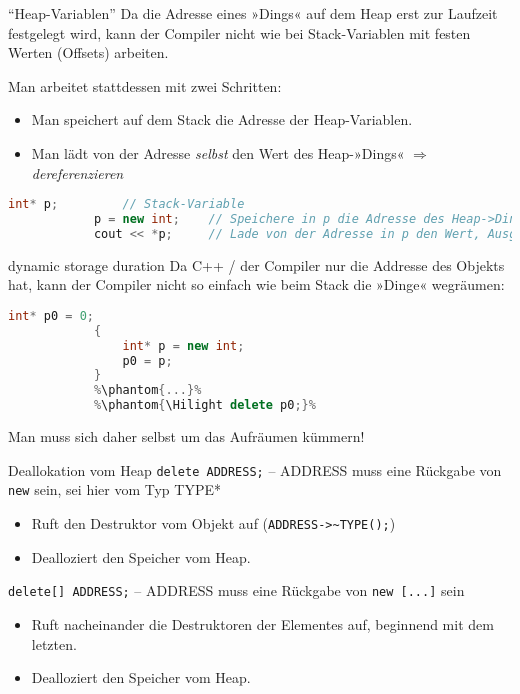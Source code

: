 \begin{frame}[fragile]{\enquote{Heap-Variablen}}
	Da die Adresse eines »Dings« auf dem Heap erst zur Laufzeit festgelegt wird, kann der Compiler nicht wie bei Stack-Variablen mit festen Werten (Offsets) arbeiten.
	
	\hspace{1em}
	\pause
	
	Man arbeitet stattdessen mit zwei Schritten:
	\begin{itemize}
		\item Man speichert auf dem Stack die Adresse der Heap-Variablen.
		\item Man lädt von der Adresse \emph{selbst} den Wert des Heap-»Dings« $\Rightarrow$ \emph{dereferenzieren}
	\end{itemize}
	\pause
	
	\footnotesize
	\begin{block}{}
		\begin{lstlisting}[language=C++]
			int* p;         // Stack-Variable
			p = new int;    // Speichere in p die Adresse des Heap->Dings<.
			cout << *p;     // Lade von der Adresse in p den Wert, Ausgabe.
		\end{lstlisting}
	\end{block}
\end{frame}

\begin{frame}[fragile]{dynamic storage duration}
	Da C++ / der Compiler nur die Addresse des Objekts hat, kann der Compiler nicht so einfach wie beim Stack die »Dinge« wegräumen:
	
	{\footnotesize
	\begin{block}{}
		\begin{lstlisting}[language=C++, escapechar=\%]
			int* p0 = 0;
			{
			    int* p = new int;
			    p0 = p;
			}
			%\phantom{...}%
			%\phantom{\Hilight delete p0;}%
		\end{lstlisting}
	\end{block}
	}
	
	Man muss sich daher selbst um das Aufräumen kümmern!
\end{frame}

\begin{frame}[fragile]{Deallokation vom Heap}
	\verb|delete ADDRESS;| -- ADDRESS muss eine Rückgabe von \verb|new| sein, sei hier vom Typ TYPE*
	\begin{itemize}
		\item Ruft den Destruktor vom Objekt auf (\verb|ADDRESS->~TYPE();|)
		\item Dealloziert den Speicher vom Heap.
	\end{itemize}
	
	\vspace{2em}
	
	\verb|delete[] ADDRESS;| -- ADDRESS muss eine Rückgabe von \verb|new [...]| sein
	\begin{itemize}
		\item Ruft nacheinander die Destruktoren der Elementes auf, beginnend mit dem letzten.
		\item Dealloziert den Speicher vom Heap.
	\end{itemize}
\end{frame}


